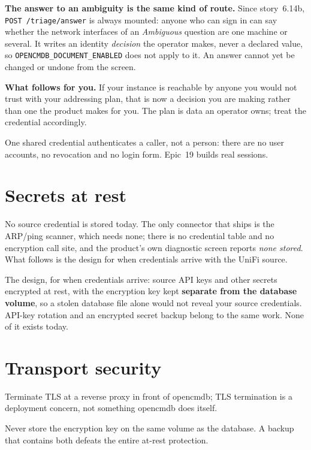 \documentclass[11pt,oneside,listof=totoc,bibliography=totoc]{scrreprt}
\begin{document}
\textbf{The answer to an ambiguity is the same kind of route.} Since story~6.14b,
\texttt{POST /triage/answer} is always mounted: anyone who can sign in can say whether the network
interfaces of an \emph{Ambiguous} question are one machine or several. It writes an identity
\emph{decision} the operator makes, never a declared value, so \texttt{OPENCMDB\_DOCUMENT\_ENABLED}
does not apply to it. An answer cannot yet be changed or undone from the screen.

\textbf{What follows for you.} If your instance is reachable by anyone you would not trust
with your addressing plan, that is now a decision you are making rather than one the product
makes for you. The plan is data an operator owns; treat the credential accordingly.

\begin{planned}
One shared credential authenticates a caller, not a person: there are no user accounts, no
revocation and no login form. Epic~19 builds real sessions.
\end{planned}

\section{Secrets at rest}
\begin{planned}
No source credential is stored today. The only connector that ships is the ARP/ping scanner,
which needs none; there is no credential table and no encryption call site, and the product's
own diagnostic screen reports \emph{none stored}. What follows is the design for when
credentials arrive with the UniFi source.
\end{planned}
\begin{planned}
The design, for when credentials arrive: source API keys and other secrets encrypted at rest,
with the encryption key kept \textbf{separate from the database volume}, so a stolen database
file alone would not reveal your source credentials. API-key rotation and an encrypted secret
backup belong to the same work. None of it exists today.
\end{planned}

\section{Transport security}
Terminate TLS at a reverse proxy in front of opencmdb; TLS termination is a deployment
concern, not something opencmdb does itself.

\begin{warning}
Never store the encryption key on the same volume as the database. A backup that contains
both defeats the entire at-rest protection.
\end{warning}
\end{document}
